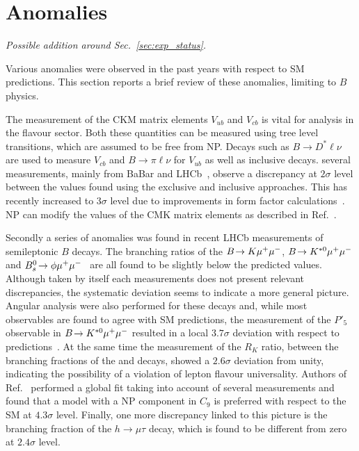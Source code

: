 


\section{Anomalies}

{\em Possible addition around Sec.~\ref{sec:exp_status}.}

Various anomalies were observed in the past years with respect to SM predictions.
This section reports a brief review of these anomalies, limiting to $B$ physics.

The measurement of the CKM matrix elements $V_{ub}$ and $V_{cb}$
is vital for analysis in the flavour sector. Both these quantities can be measured
using tree level transitions, which are assumed to be free from NP.
Decays such as $B\to D^{*}\ell\nu$ are used to measure $V_{cb}$
and $B\to\pi\ell\nu$ for $V_{ub}$ as well as inclusive decays.
several measurements, mainly from BaBar and LHCb~\cite{Aaij:2015bfa,}, observe a discrepancy
at $2\sigma$ level between the values found using the exclusive and inclusive approaches.
This has recently increased to $3\sigma$ level due to improvements in form factor calculations~\cite{Crivellin:2014zpa}.
NP can modify the values of the CMK matrix elements as described in Ref.~\cite{}.

Secondly a series of anomalies was found in recent LHCb measurements of semileptonic $B$ decays.
The branching ratios of the $B\!\rightarrow K\mu^+\mu^-$, $B\!\rightarrow K^{*0}\mu^+\mu^-$
and $B^0_s\!\rightarrow \phi\mu^+\mu^-$~\cite{LHCB-PAPER-2014-006,LHCB-PAPER-2013-017,LHCB-PAPER-2013-019}
are all found to be slightly below the predicted values. Although taken by itself each measurements
does not present relevant discrepancies, the systematic deviation seems to indicate a more general picture.
Angular analysis were also performed for these decays and, while most observables are found
to agree with SM predictions, the measurement of the $P'_5$ observable in $B\!\rightarrow K^{*0}\mu^+\mu^-$
resulted in a local $3.7\sigma$ deviation with respect to predictions~\cite{}.
At the same time the measurement of the $R_K$ ratio, between the branching fractions
of the \Bz\to\Kstarz\mumu and \Bz\to\Kstarz\ee decays, showed a $2.6\sigma$ deviation from unity,
indicating the possibility of a violation of lepton flavour universality.
Authors of Ref.~\cite{Altmannshofer:2014rta} performed a global fit taking into account of several measurements
and found that a model with a NP component in $C_9$ is preferred with respect to the SM at $4.3\sigma$ level.
Finally, one more discrepancy linked to this picture is the branching fraction of the $h\to\mu\tau$ decay,
which is found to be different from zero at $2.4\sigma$ level.


 








